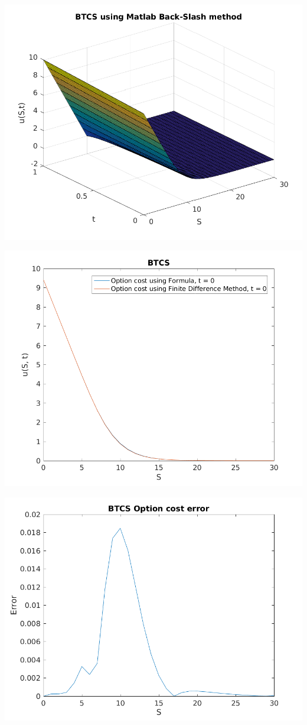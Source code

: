 \documentclass{article}
\begin{document}
\includegraphics{"q2_13"}
\pagebreak


\includegraphics{"q2_14"}
\pagebreak


\includegraphics{"q2_15"}
\pagebreak
\end{document}

